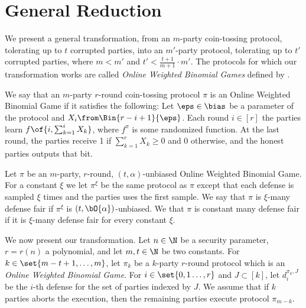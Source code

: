 \section{General Reduction}\label{sec:reduction}
We present a general transformation, from an $m$-party coin-tossing protocol, tolerating up to $t$ corrupted parties, into an $m'$-party protocol, tolerating up to $t'$ corrupted parties, where $m<m'$ and $t'<\frac{t+1}{m+1}\cdot m'$. The protocols for which our transformation works are called \emph{Online Weighted Binomial Games} defined by \cite{HT14}.
\begin{definition}
We say that an $m$-party $r$-round coin-tossing protocol $\pi$ is an Online Weighted Binomial Game if it satisfies the following: Let $\eps\in\bias$ be a parameter of the protocol and $X_i\from\Bin{r-i+1}{\eps}$. Each round $i\in[r]$ the parties learn $f\of{i,\sum_{k=1}^i X_k}$, where $f^{\pi}$ is some randomized function. At the last round, the parties receive 1 if $\sum_{k=1}^r X_k\geq0$ and 0 otherwise, and the honest parties outputs that bit.
\end{definition}

\begin{definition}
Let $\pi$ be an $m$-party, $r$-round, $(t,\alpha)$-unbiased Online Weighted Binomial Game. For a constant $\xi$ we let $\pi^{\xi}$ be the same protocol as $\pi$ except that each defense is sampled $\xi$ times and the parties uses the first sample. We say that $\pi$ is $\xi$-many defense fair if $\pi^{\xi}$ is $(t,\bO{\alpha})$-unbiased. We that $\pi$ is constant many defense fair if it is $\xi$-many defense fair for every constant $\xi$.
\end{definition}

We now present our transformation. Let $n\in\N$ be a security parameter, $r=r(n)$ a polynomial, and let $m,t\in\N$ be two constants. For $k\in\set{m-t+1,\ldots,m}$, let $\pi_k$ be a $k$-party $r$-round protocol which is an \emph{Online Weighted Binomial Game}. For $i\in\set{0,1\ldots,r}$ and $J\subset[k]$, let $d_i^{\pi_k,J}$ be the $i$-th defense for the set of parties indexed by $J$. We assume \wlg that if $k$ parties aborts the execution, then the remaining parties execute protocol $\pi_{m-k}$.


